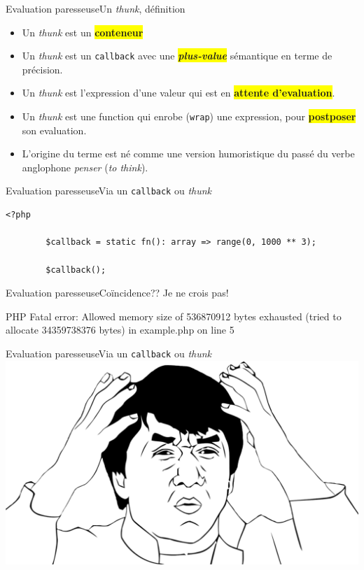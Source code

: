 \begin{frame}{Evaluation paresseuse}{Un \textit{thunk}, définition}
    \begin{itemize}[<+->]
        \item Un \textit{thunk} est un \colorbox{yellow}{\textbf{conteneur}}
        \item Un \textit{thunk} est un \texttt{callback} avec une
        \colorbox{yellow}{\textbf{\textit{plus-value}}} sémantique en terme de
        précision.
        \item Un \textit{thunk} est l'expression d'une valeur qui est en
        \colorbox{yellow}{\textbf{attente d'evaluation}}.
        \item Un \textit{thunk} est une function qui enrobe (\texttt{wrap}) une
        expression, pour \colorbox{yellow}{\textbf{postposer}} son evaluation.
        \item L'origine du terme est né comme une version humoristique du passé
        du verbe anglophone \textit{penser} (\textit{to think}).
    \end{itemize}
\end{frame}

\begin{frame}[fragile]{Evaluation paresseuse}{Via un \texttt{callback} ou \textit{thunk}}
    \begin{lstlisting}[firstnumber=1]
        <?php

        $callback = static fn(): array => range(0, 1000 ** 3);

        $callback();
    \end{lstlisting}
\end{frame}

\begin{frame}[fragile]{Evaluation paresseuse}{Coïncidence?? Je ne crois pas!}
    \begin{spverbatim}
        PHP Fatal error: Allowed memory size of 536870912 bytes exhausted (tried to allocate 34359738376 bytes) in example.php on line 5
    \end{spverbatim}
\end{frame}

\begin{frame}[fragile]{Evaluation paresseuse}{Via un \texttt{callback} ou \textit{thunk}}
    \includegraphics[width=\textwidth]{meme/wtf.png}
\end{frame}

